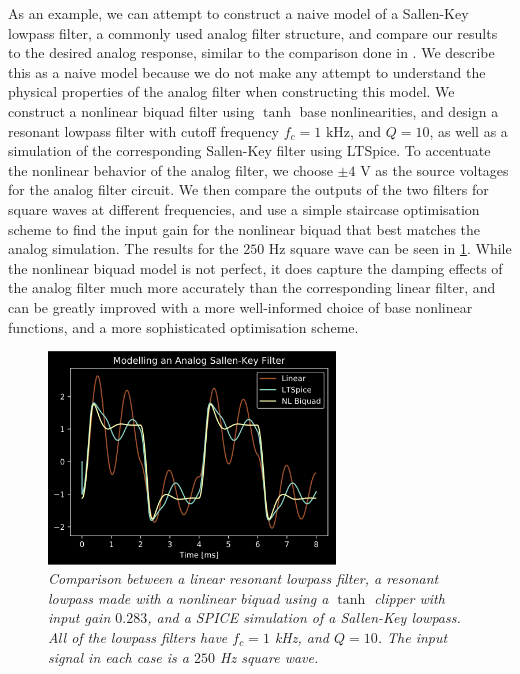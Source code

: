 \documentclass{IEEEtran}
\begin{document}
As an example, we can attempt to construct a naive model of a Sallen-Key
lowpass filter, a commonly used analog filter structure, and compare
our results to the desired analog response, similar to the
comparison done in \cite{SKF}. We describe this
as a naive model because we do not make any attempt to understand the physical
properties of the analog filter when constructing this model. We construct
a nonlinear biquad filter using $\tanh$ base nonlinearities, and design a
resonant lowpass filter with cutoff frequency $f_c = 1 \text{ kHz}$,
and $Q=10$, as well as a simulation of the corresponding Sallen-Key
filter using LTSpice. To accentuate the nonlinear behavior of the analog
filter, we choose $\pm 4 \text{ V}$ as the source voltages for the analog
filter circuit.
\newline\newline
We then compare the outputs of the two filters
for square waves at different frequencies, and use a simple staircase
optimisation scheme to find the input gain for the nonlinear biquad
that best matches the analog simulation. The results for the $250 \text{ Hz}$
square wave can be seen in \cref{SPICE}. While the nonlinear biquad model
is not perfect, it does capture the damping effects of the analog filter
much more accurately than the corresponding linear filter, and can be greatly
improved with a more well-informed choice of base nonlinear functions, and
a more sophisticated optimisation scheme.
%
\begin{figure}[ht]
    \center
    \includegraphics[width=3in]{../Pics/Spice-Compare.png}
    \caption{\label{SPICE}{\it Comparison between a linear resonant lowpass
                            filter, a resonant lowpass made with a nonlinear biquad
                            using a $\tanh$ clipper with input gain $0.283$,
                            and a SPICE simulation of a Sallen-Key lowpass.
                            All of the lowpass filters have $f_c=1$ kHz, and
                            $Q=10$. The input signal in each case is a $250$ Hz
                            square wave.}}
\end{figure}
%
\end{document}
